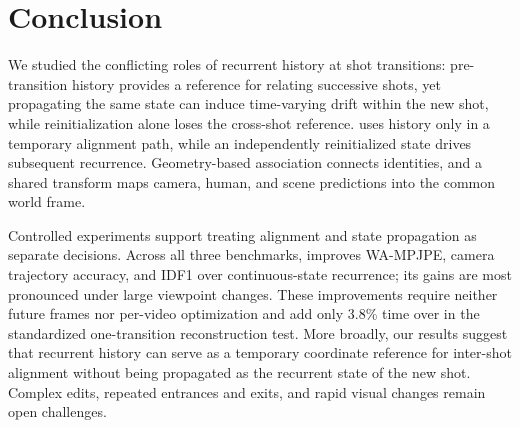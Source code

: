 \section{Conclusion}

We studied the conflicting roles of recurrent history at shot transitions:
pre-transition history provides a reference for relating successive shots,
yet propagating the same state can induce time-varying drift within the new
shot, while reinitialization alone loses the cross-shot reference. \method{}
uses history only in a temporary alignment path, while an
independently reinitialized state drives subsequent recurrence. Geometry-based
association connects identities, and a shared transform maps camera, human,
and scene predictions into the common world frame.

Controlled experiments support treating alignment and state propagation as
separate decisions. Across all three benchmarks, \method{} improves WA-MPJPE,
camera trajectory accuracy, and IDF1 over continuous-state recurrence; its
gains are most pronounced under large viewpoint changes. These improvements
require neither future frames nor per-video optimization and add only 3.8\%
time over \humanthree{} in the standardized one-transition reconstruction
test. More broadly, our results suggest that recurrent history can serve as a
temporary coordinate reference for inter-shot alignment without being
propagated as the recurrent state of the new shot. Complex edits, repeated
entrances and exits, and rapid visual changes remain open challenges.
